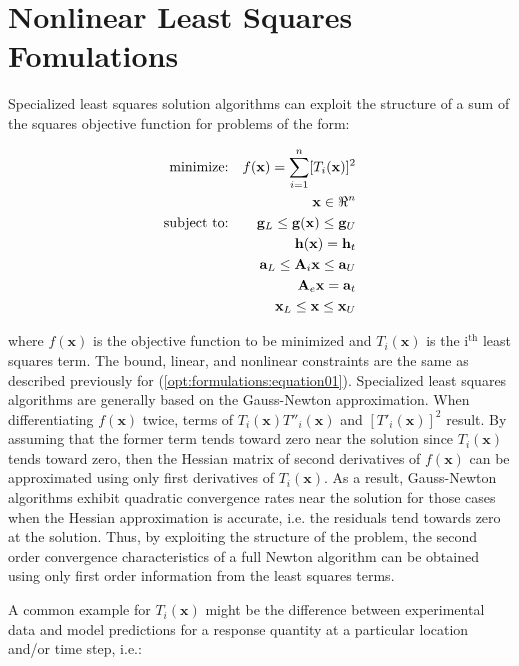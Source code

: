 \section{Nonlinear Least Squares Fomulations}\label{nls:formulations}

Specialized least squares solution algorithms can exploit the
structure of a sum of the squares objective function for problems of
the form:

\begin{eqnarray}
  \hbox{minimize:} & & f(\mathbf{x}) =
  \sum_{i=1}^{n}[T_i(\mathbf{x})]^2\nonumber\\
  & & \mathbf{x} \in \Re^{n}\nonumber\\
  \hbox{subject to:} & &
  \mathbf{g}_L \leq \mathbf{g(x)} \leq \mathbf{g}_U\nonumber\\
  & & \mathbf{h(x)}=\mathbf{h}_{t}\label{nls:equation02}\\
  & & \mathbf{a}_L \leq \mathbf{A}_i\mathbf{x} \leq
  \mathbf{a}_U\nonumber\\
  & & \mathbf{A}_e\mathbf{x}=\mathbf{a}_{t}\nonumber\\
  & & \mathbf{x}_L \leq \mathbf{x} \leq \mathbf{x}_U\nonumber
\end{eqnarray}

where $f(\mathbf{x})$ is the objective function to be minimized and
$T_i(\mathbf{x})$ is the i$^{\mathrm{th}}$ least squares term. The
bound, linear, and nonlinear constraints are the same as described
previously for (\ref{opt:formulations:equation01}). Specialized least
squares algorithms are generally based on the Gauss-Newton
approximation. When differentiating $f(\mathbf{x})$ twice, terms of
$T_i(\mathbf{x})T''_i(\mathbf{x})$ and $[T'_i(\mathbf{x})]^{2}$
result. By assuming that the former term tends toward zero near the
solution since $T_i(\mathbf{x})$ tends toward zero, then the Hessian
matrix of second derivatives of $f(\mathbf{x})$ can be approximated
using only first derivatives of $T_i(\mathbf{x})$. As a result,
Gauss-Newton algorithms exhibit quadratic convergence rates near the
solution for those cases when the Hessian approximation is accurate,
i.e. the residuals tend towards zero at the solution. Thus, by
exploiting the structure of the problem, the second order convergence
characteristics of a full Newton algorithm can be obtained using only
first order information from the least squares terms.

A common example for $T_i(\mathbf{x})$ might be the difference
between experimental data and model predictions for a response
quantity at a particular location and/or time step, i.e.:

